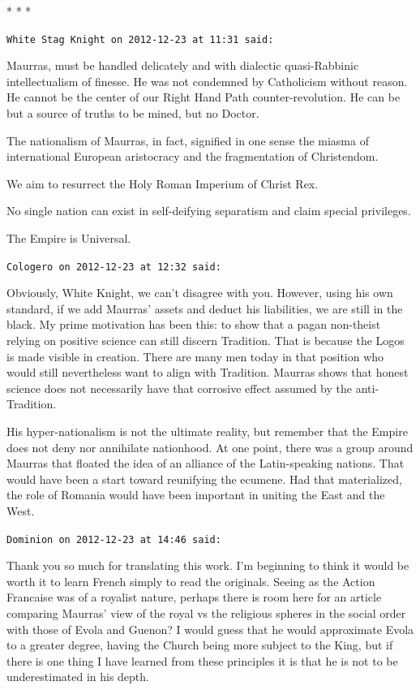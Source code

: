 \begin{center}* * *\end{center}

\begin{footnotesize}\begin{sffamily}



\texttt{White Stag Knight on 2012-12-23 at 11:31 said: }

Maurras, must be handled delicately and with dialectic quasi-Rabbinic intellectualism of finesse. He was not condemned by Catholicism without reason. He cannot be the center of our Right Hand Path counter-revolution. He can be but a source of truths to be mined, but no Doctor. 

The nationalism of Maurras, in fact, signified in one sense the miasma of international European aristocracy and the fragmentation of Christendom.

We aim to resurrect the Holy Roman Imperium of Christ Rex. 

No single nation can exist in self-deifying separatism and claim special privileges.

The Empire is Universal.


\hfill

\texttt{Cologero on 2012-12-23 at 12:32 said: }

Obviously, White Knight, we can't disagree with you. However, using his own standard, if we add Maurras' assets and deduct his liabilities, we are still in the black. My prime motivation has been this: to show that a pagan non-theist relying on positive science can still discern Tradition. That is because the Logos is made visible in creation. There are many men today in that position who would still nevertheless want to align with Tradition. Maurras shows that honest science does not necessarily have that corrosive effect assumed by the anti-Tradition.

His hyper-nationalism is not the ultimate reality, but remember that the Empire does not deny nor annihilate nationhood. At one point, there was a group around Maurras that floated the idea of an alliance of the Latin-speaking nations. That would have been a start toward reunifying the ecumene. Had that materialized, the role of Romania would have been important in uniting the East and the West.


\hfill

\texttt{Dominion on 2012-12-23 at 14:46 said: }

Thank you so much for translating this work. I'm beginning to think it would be worth it to learn French simply to read the originals. Seeing as the Action Francaise was of a royalist nature, perhaps there is room here for an article comparing Maurras' view of the royal vs the religious spheres in the social order with those of Evola and Guenon? I would guess that he would approximate Evola to a greater degree, having the Church being more subject to the King, but if there is one thing I have learned from these principles it is that he is not to be underestimated in his depth. 


\end{sffamily}
\end{footnotesize}
